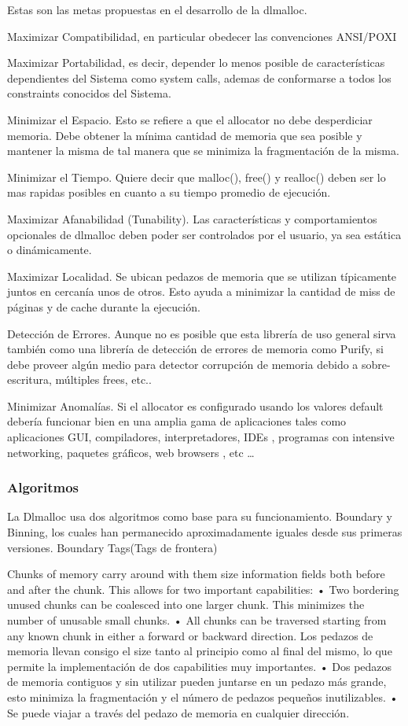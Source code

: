 \documentclass[11pt]{article} %
\begin{document}
Estas son las metas propuestas en el desarrollo de la dlmalloc.

Maximizar Compatibilidad, en particular obedecer las convenciones ANSI/POXI

Maximizar Portabilidad, es decir, depender lo menos posible de características dependientes del Sistema como system calls, ademas de conformarse a todos los constraints conocidos del Sistema.

Minimizar el Espacio. Esto se refiere a que el allocator no debe desperdiciar memoria. Debe obtener la mínima cantidad de memoria que sea posible y mantener la misma de tal manera que se minimiza la fragmentación de la misma.

Minimizar el Tiempo. Quiere decir que malloc(), free() y realloc() deben ser lo mas rapidas posibles en cuanto a su tiempo promedio de ejecución.

Maximizar Afanabilidad (Tunability). Las características y comportamientos opcionales de dlmalloc deben poder ser controlados por el usuario, ya sea estática o dinámicamente.

Maximizar Localidad. Se ubican pedazos de memoria que se utilizan típicamente juntos en cercanía unos de otros. Esto ayuda a minimizar la cantidad de miss de páginas y de cache durante la ejecución.




Detección de Errores. Aunque no es posible que esta librería de uso general sirva también como una librería de detección de errores de memoria como Purify, si debe proveer algún medio para detector corrupción de memoria debido a sobre-escritura, múltiples frees, etc..

Minimizar Anomalías. Si el allocator es configurado usando los valores default debería funcionar bien en una amplia gama de aplicaciones tales como aplicaciones GUI, compiladores, interpretadores, IDEs , programas con intensive networking, paquetes gráficos, web browsers , etc …

\subsubsection{Algoritmos}

La Dlmalloc usa dos algoritmos como base para su funcionamiento. Boundary y Binning, los cuales han permanecido aproximadamente iguales desde sus primeras versiones.
Boundary Tags(Tags de frontera)

Chunks of memory carry around with them size information fields both before and after the chunk. This allows for two important capabilities:
•	Two bordering unused chunks can be coalesced into one larger chunk. This minimizes the number of unusable small chunks.
•	All chunks can be traversed starting from any known chunk in either a forward or backward direction.
Los pedazos de memoria llevan consigo el size tanto al principio como al final del mismo, lo que permite la implementación de dos capabilities muy importantes.
•	Dos pedazos de memoria contiguos y sin utilizar pueden juntarse en un pedazo más grande, esto minimiza la fragmentación y el número de pedazos pequeños inutilizables.
•	Se puede viajar a través del pedazo de memoria en cualquier dirección.
\end{document}
